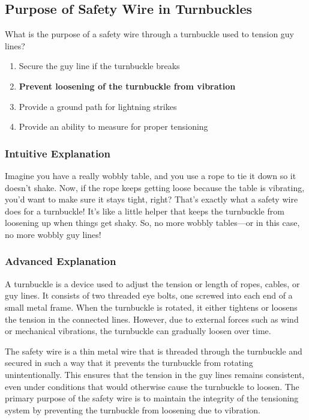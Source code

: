 \subsection{Purpose of Safety Wire in Turnbuckles}
\label{T0B05}

\begin{tcolorbox}[colback=gray!10!white,colframe=black!75!black,title=T0B05]
What is the purpose of a safety wire through a turnbuckle used to tension guy lines?
\begin{enumerate}[label=\Alph*)]
    \item Secure the guy line if the turnbuckle breaks
    \item \textbf{Prevent loosening of the turnbuckle from vibration}
    \item Provide a ground path for lightning strikes
    \item Provide an ability to measure for proper tensioning
\end{enumerate}
\end{tcolorbox}

\subsubsection{Intuitive Explanation}
Imagine you have a really wobbly table, and you use a rope to tie it down so it doesn’t shake. Now, if the rope keeps getting loose because the table is vibrating, you’d want to make sure it stays tight, right? That’s exactly what a safety wire does for a turnbuckle! It’s like a little helper that keeps the turnbuckle from loosening up when things get shaky. So, no more wobbly tables—or in this case, no more wobbly guy lines!

\subsubsection{Advanced Explanation}
A turnbuckle is a device used to adjust the tension or length of ropes, cables, or guy lines. It consists of two threaded eye bolts, one screwed into each end of a small metal frame. When the turnbuckle is rotated, it either tightens or loosens the tension in the connected lines. However, due to external forces such as wind or mechanical vibrations, the turnbuckle can gradually loosen over time.

The safety wire is a thin metal wire that is threaded through the turnbuckle and secured in such a way that it prevents the turnbuckle from rotating unintentionally. This ensures that the tension in the guy lines remains consistent, even under conditions that would otherwise cause the turnbuckle to loosen. The primary purpose of the safety wire is to maintain the integrity of the tensioning system by preventing the turnbuckle from loosening due to vibration.

